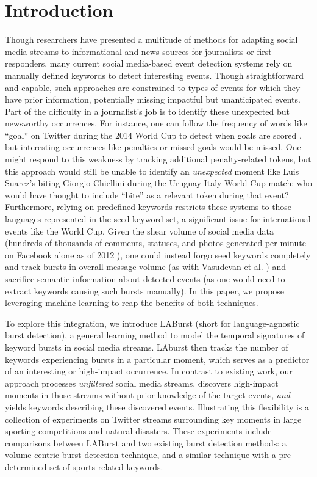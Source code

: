 \documentclass[letterpaper]{article}
\begin{document}
\section{Introduction}

Though researchers have presented a multitude of methods for adapting social media streams to informational and news sources for journalists or first responders, many current social media-based event detection systems rely on manually defined keywords to detect interesting events.
Though straightforward and capable, such approaches are constrained to types of events for which they have prior information, potentially missing impactful but unanticipated events.
Part of the difficulty in a journalist's job is to identify these unexpected but newsworthy occurrences.
For instance, one can follow the frequency of words like ``goal'' on Twitter during the 2014 World Cup to detect when goals are scored \cite{Cipriani2014}, but interesting occurrences like penalties or missed goals would be missed.
One might respond to this weakness by tracking additional penalty-related tokens, but this approach would still be unable to identify an \emph{unexpected} moment like Luis Suarez's biting Giorgio Chiellini during the Uruguay-Italy World Cup match; who would have thought to include ``bite'' as a relevant token during that event?
Furthermore, relying on predefined keywords restricts these systems to those languages represented in the seed keyword set, a significant issue for international events like the World Cup.
Given the shear volume of social media data (hundreds of thousands of comments, statuses, and photos generated per minute on Facebook alone as of 2012 \cite{Pring2012}), one could instead forgo seed keywords completely and track bursts in overall message volume (as with Vasudevan et al. \cite{vasudevan2013twitter}) and sacrifice semantic information about detected events (as one would need to extract keywords causing such bursts manually).
In this paper, we propose leveraging machine learning to reap the benefits of both techniques.

To explore this integration, we introduce LABurst (short for language-agnostic burst detection), a general learning method to model the temporal signatures of keyword bursts in social media streams.
LAburst then tracks the number of keywords experiencing bursts in a particular moment, which serves as a predictor of an interesting or high-impact occurrence. 
In contrast to existing work, our approach processes \emph{unfiltered} social media streams, discovers high-impact moments in those streams without prior knowledge of the target events, \emph{and} yields keywords describing these discovered events.
Illustrating this flexibility is a collection of experiments on Twitter streams surrounding key moments in large sporting competitions and natural disasters.
These experiments include comparisons between LABurst and two existing burst detection methods: a volume-centric burst detection technique, and a similar technique with a pre-determined set of sports-related keywords.
\end{document}
